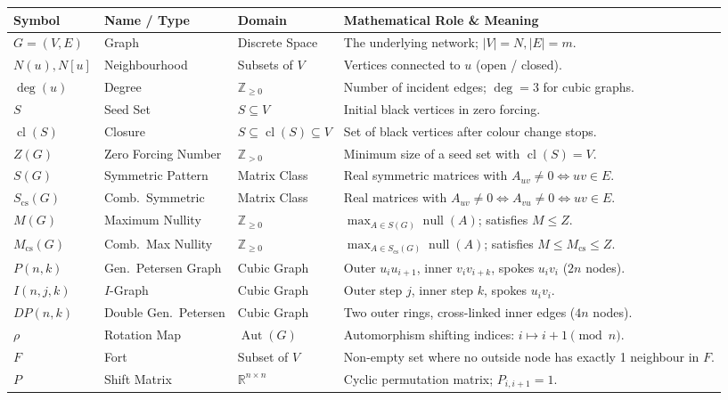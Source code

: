 \documentclass[11pt]{article}
\begin{document}
\begin{table}[htbp]
\centering
\small
\begin{tabular}{@{}llp{2.6cm}p{6.6cm}@{}}
\toprule
\textbf{Symbol} & \textbf{Name / Type} & \textbf{Domain} & \textbf{Mathematical Role \& Meaning} \\
\midrule
$G = (V, E)$ & Graph & Discrete Space & The underlying network; $|V|=N, |E|=m$. \\
$N(u), N[u]$ & Neighbourhood & Subsets of $V$ & Vertices connected to $u$ (open / closed). \\
$\deg(u)$ & Degree & $\mathbb{Z}_{\ge 0}$ & Number of incident edges; $\deg=3$ for cubic graphs. \\
$S$ & Seed Set & $S \subseteq V$ & Initial black vertices in zero forcing. \\
$\operatorname{cl}(S)$ & Closure & $S \subseteq \operatorname{cl}(S) \subseteq V$ & Set of black vertices after colour change stops. \\
$Z(G)$ & Zero Forcing Number & $\mathbb{Z}_{> 0}$ & Minimum size of a seed set with $\operatorname{cl}(S) = V$. \\
$S(G)$ & Symmetric Pattern & Matrix Class & Real symmetric matrices with $A_{uv} \ne 0 \iff uv \in E$. \\
$S_{\mathrm{cs}}(G)$ & Comb.\ Symmetric & Matrix Class & Real matrices with $A_{uv} \ne 0 \iff A_{vu} \ne 0 \iff uv \in E$. \\
$M(G)$ & Maximum Nullity & $\mathbb{Z}_{\ge 0}$ & $\max_{A \in S(G)} \operatorname{null}(A)$; satisfies $M \le Z$. \\
$M_{\mathrm{cs}}(G)$ & Comb.\ Max Nullity & $\mathbb{Z}_{\ge 0}$ & $\max_{A \in S_{\mathrm{cs}}(G)} \operatorname{null}(A)$; satisfies $M \le M_{\mathrm{cs}} \le Z$. \\
$P(n,k)$ & Gen.\ Petersen Graph & Cubic Graph & Outer $u_i u_{i+1}$, inner $v_i v_{i+k}$, spokes $u_i v_i$ ($2n$ nodes). \\
$I(n,j,k)$ & $I$-Graph & Cubic Graph & Outer step $j$, inner step $k$, spokes $u_i v_i$. \\
$DP(n,k)$ & Double Gen.\ Petersen & Cubic Graph & Two outer rings, cross-linked inner edges ($4n$ nodes). \\
$\rho$ & Rotation Map & $\operatorname{Aut}(G)$ & Automorphism shifting indices: $i \mapsto i+1 \pmod n$. \\
$F$ & Fort & Subset of $V$ & Non-empty set where no outside node has exactly 1 neighbour in $F$. \\
$P$ & Shift Matrix & $\mathbb{R}^{n \times n}$ & Cyclic permutation matrix; $P_{i, i+1} = 1$. \\

\end{tabular}
\end{table}
\end{document}
